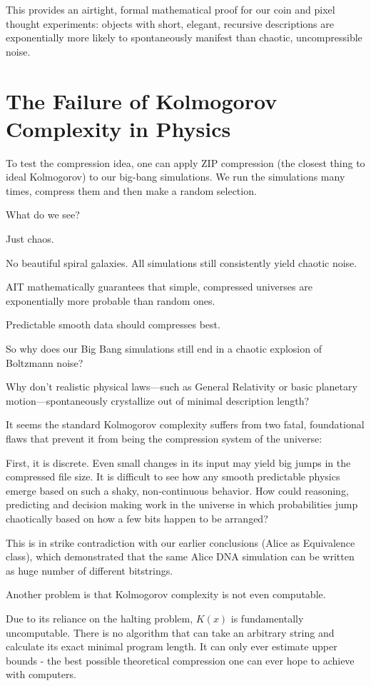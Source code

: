 This provides an airtight, formal mathematical proof for our coin and pixel thought experiments: objects with short, elegant, recursive descriptions are exponentially more likely to 
spontaneously manifest than chaotic, uncompressible noise. 


\section{The Failure of Kolmogorov Complexity in Physics}

To test the compression idea, one can apply ZIP compression (the closest thing to ideal Kolmogorov) to our  big-bang simulations. We run
the simulations many times, compress them and then make a random selection.

What do we see? 

Just chaos.

No beautiful spiral galaxies. All simulations still consistently yield chaotic noise. 

AIT mathematically guarantees that simple, compressed universes are exponentially more probable than random ones.

Predictable smooth data should compresses best.

So why does our Big Bang simulations still end in a chaotic explosion of Boltzmann noise?

Why don't realistic physical laws—such as General Relativity or basic planetary motion—spontaneously crystallize out of minimal description length?

It seems the standard Kolmogorov complexity suffers from two fatal, foundational flaws that prevent it from being the compression system of the universe:

First, it is discrete. Even small changes in its input may yield big jumps in the compressed file size. It is difficult to see how any smooth predictable physics emerge based on such a shaky,
non-continuous behavior. How could reasoning, predicting and decision making work in the universe in which probabilities jump chaotically based on how a few bits happen to be arranged?

This is in strike contradiction with our earlier conclusions (Alice as Equivalence class), which demonstrated that the same Alice DNA simulation can be written as huge number of different bitstrings.

Another problem is that Kolmogorov complexity is not even computable.

Due to its reliance on the halting problem, $K(x)$ is fundamentally uncomputable.
There is no algorithm that can take an arbitrary string and calculate its exact minimal program length.
It can only ever estimate upper bounds - the best possible theoretical compression one can ever hope to achieve with computers. 

